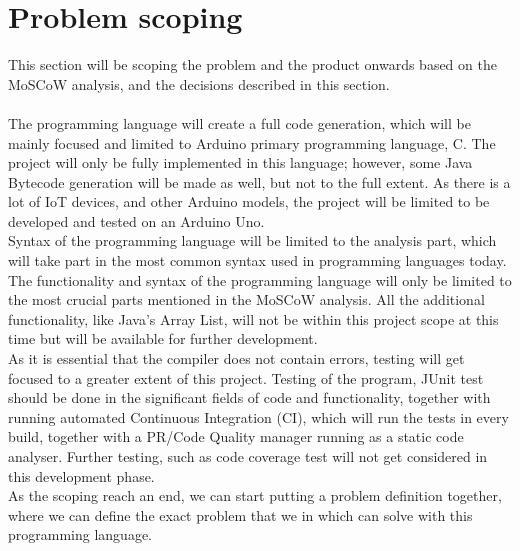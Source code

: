 \section{Problem scoping}
This section will be scoping the problem and the product onwards based on the MoSCoW analysis, and the decisions described in this section.  \\
\\
The programming language will create a full code generation, which will be mainly focused and limited to Arduino primary programming language, C. The project will only be fully implemented in this language; however, some Java Bytecode generation will be made as well, but not to the full extent. As there is a lot of IoT devices, and other Arduino models, the project will be limited to be developed and tested on an Arduino Uno.  \\
Syntax of the programming language will be limited to the analysis part, which will take part in the most common syntax used in programming languages today. The functionality and syntax of the programming language will only be limited to the most crucial parts mentioned in the MoSCoW analysis. All the additional functionality, like Java’s Array List, will not be within this project scope at this time but will be available for further development. \\
As it is essential that the compiler does not contain errors, testing will get focused to a greater extent of this project. Testing of the program, JUnit test should be done in the significant fields of code and functionality, together with running automated Continuous Integration (CI), which will run the tests in every build, together with a PR/Code Quality manager running as a static code analyser. Further testing, such as code coverage test will not get considered in this development phase.  \\


As the scoping reach an end, we can start putting a problem definition together, where we can define the exact problem that we in which can solve with this programming language.  